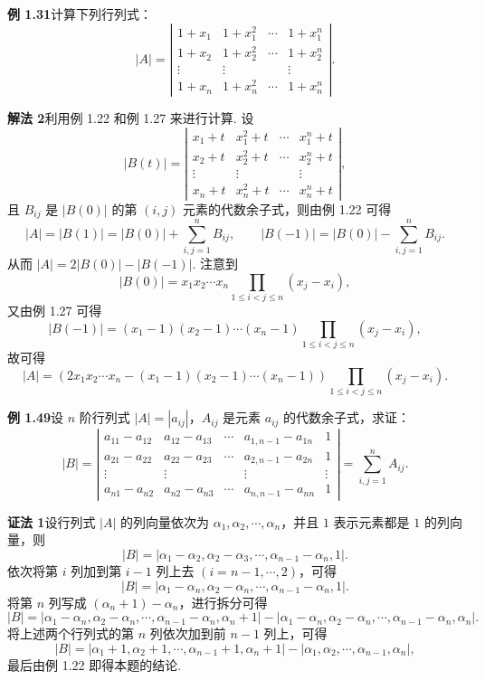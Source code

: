 \documentclass[UTF8,12pt,a4paper,fontset=fandol]{ctexart}
\begin{document}
\noindent\textbf{例 1.31}\quad 计算下列行列式：
\[
|A|=\left|\begin{array}{cccc}
1+x_1 & 1+x_1^2 & \cdots & 1+x_1^n\\
1+x_2 & 1+x_2^2 & \cdots & 1+x_2^n\\
\vdots & \vdots &        & \vdots\\
1+x_n & 1+x_n^2 & \cdots & 1+x_n^n
\end{array}\right|.
\]

\noindent\textbf{解法 2}\quad 利用例 1.22 和例 1.27 来进行计算. 设
\[
|B(t)|=\left|\begin{array}{cccc}
x_1+t & x_1^2+t & \cdots & x_1^n+t\\
x_2+t & x_2^2+t & \cdots & x_2^n+t\\
\vdots & \vdots &        & \vdots\\
x_n+t & x_n^2+t & \cdots & x_n^n+t
\end{array}\right|,
\]
且 $B_{ij}$ 是 $|B(0)|$ 的第 $(i,j)$ 元素的代数余子式，则由例 1.22 可得
\[
|A|=|B(1)|=|B(0)|+\sum_{i,j=1}^n B_{ij},\qquad
|B(-1)|=|B(0)|-\sum_{i,j=1}^n B_{ij}.
\]
从而 $|A|=2|B(0)|-|B(-1)|$. 注意到
\[
|B(0)|=x_1x_2\cdots x_n\prod_{1\le i<j\le n}(x_j-x_i),
\]
又由例 1.27 可得
\[
|B(-1)|=(x_1-1)(x_2-1)\cdots(x_n-1)\prod_{1\le i<j\le n}(x_j-x_i),
\]
故可得
\[
|A|=\left(2x_1x_2\cdots x_n-(x_1-1)(x_2-1)\cdots(x_n-1)\right)
\prod_{1\le i<j\le n}(x_j-x_i).
\]

\noindent\textbf{例 1.49}\quad 设 $n$ 阶行列式 $|A|=|a_{ij}|$，$A_{ij}$ 是元素 $a_{ij}$ 的代数余子式，求证：
\[
|B|=\left|\begin{array}{ccccc}
a_{11}-a_{12} & a_{12}-a_{13} & \cdots & a_{1,n-1}-a_{1n} & 1\\
a_{21}-a_{22} & a_{22}-a_{23} & \cdots & a_{2,n-1}-a_{2n} & 1\\
\vdots & \vdots &        & \vdots & \vdots\\
a_{n1}-a_{n2} & a_{n2}-a_{n3} & \cdots & a_{n,n-1}-a_{nn} & 1
\end{array}\right|
=\sum_{i,j=1}^n A_{ij}.
\]

\noindent\textbf{证法 1}\quad 设行列式 $|A|$ 的列向量依次为 $\alpha_1,\alpha_2,\cdots,\alpha_n$，并且 $1$ 表示元素都是 $1$ 的列向量，则
\[
|B|=|\alpha_1-\alpha_2,\alpha_2-\alpha_3,\cdots,\alpha_{n-1}-\alpha_n,1|.
\]
依次将第 $i$ 列加到第 $i-1$ 列上去 $(i=n-1,\cdots,2)$，可得
\[
|B|=|\alpha_1-\alpha_n,\alpha_2-\alpha_n,\cdots,\alpha_{n-1}-\alpha_n,1|.
\]
将第 $n$ 列写成 $(\alpha_n+1)-\alpha_n$，进行拆分可得
\[
|B|=|\alpha_1-\alpha_n,\alpha_2-\alpha_n,\cdots,\alpha_{n-1}-\alpha_n,\alpha_n+1|
-|\alpha_1-\alpha_n,\alpha_2-\alpha_n,\cdots,\alpha_{n-1}-\alpha_n,\alpha_n|.
\]
将上述两个行列式的第 $n$ 列依次加到前 $n-1$ 列上，可得
\[
|B|=|\alpha_1+1,\alpha_2+1,\cdots,\alpha_{n-1}+1,\alpha_n+1|-|\alpha_1,\alpha_2,\cdots,\alpha_{n-1},\alpha_n|,
\]
最后由例 1.22 即得本题的结论.
\end{document}
